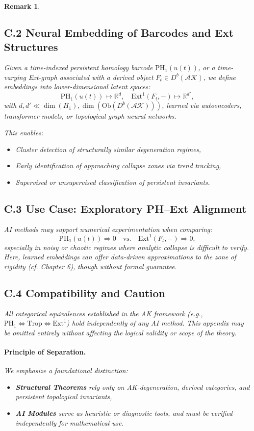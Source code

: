 \documentclass[11pt]{article}
\newtheorem{remark}[theorem]{Remark}
\begin{document}
\begin{remark}
\subsection*{C.2 Neural Embedding of Barcodes and Ext Structures}

Given a time-indexed persistent homology barcode \( \mathrm{PH}_1(u(t)) \), or a time-varying Ext-graph associated with a derived object \( F_t \in D^b(\mathcal{AK}) \), we define embeddings into lower-dimensional latent spaces:
\[
\mathrm{PH}_1(u(t)) \mapsto \mathbb{R}^d, \quad \text{Ext}^1(F_t, -) \mapsto \mathbb{R}^{d'},
\]
with \( d, d' \ll \dim(H_1), \dim(\mathrm{Ob}(D^b(\mathcal{AK}))) \), learned via autoencoders, transformer models, or topological graph neural networks.

This enables:
\begin{itemize}
  \item Cluster detection of structurally similar degeneration regimes,
  \item Early identification of approaching collapse zones via trend tracking,
  \item Supervised or unsupervised classification of persistent invariants.
\end{itemize}

\subsection*{C.3 Use Case: Exploratory PH–Ext Alignment}

AI methods may support numerical experimentation when comparing:
\[
\mathrm{PH}_1(u(t)) \Rightarrow 0 \quad \text{vs.} \quad \mathrm{Ext}^1(F_t, -) \Rightarrow 0,
\]
especially in noisy or chaotic regimes where analytic collapse is difficult to verify. Here, learned embeddings can offer data-driven approximations to the zone of rigidity (cf. Chapter 6), though without formal guarantee.

\subsection*{C.4 Compatibility and Caution}

All categorical equivalences established in the AK framework (e.g., \( \mathrm{PH}_1 \Leftrightarrow \mathrm{Trop} \Leftrightarrow \mathrm{Ext}^1 \)) hold independently of any AI method. This appendix may be omitted entirely without affecting the logical validity or scope of the theory.

\paragraph{Principle of Separation.}
We emphasize a foundational distinction:
\begin{itemize}
  \item \textbf{Structural Theorems} rely only on AK-degeneration, derived categories, and persistent topological invariants,
  \item \textbf{AI Modules} serve as heuristic or diagnostic tools, and must be verified independently for mathematical use.
\end{itemize}


\end{remark}
\end{document}
